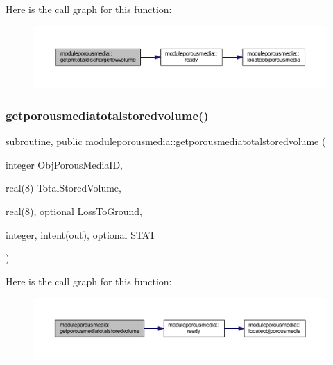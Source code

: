 Here is the call graph for this function\+:\nopagebreak
\begin{figure}[H]
\begin{center}
\leavevmode
\includegraphics[width=350pt]{namespacemoduleporousmedia_a4ef35ba24ac6cd6fbf310e39c0892c80_cgraph}
\end{center}
\end{figure}
\mbox{\label{namespacemoduleporousmedia_a3a5ad5a7ceee985765e313febb118f98}} 
\subsubsection{\texorpdfstring{getporousmediatotalstoredvolume()}{getporousmediatotalstoredvolume()}}
{\footnotesize\ttfamily subroutine, public moduleporousmedia\+::getporousmediatotalstoredvolume (\begin{DoxyParamCaption}\item[{integer}]{Obj\+Porous\+Media\+ID,  }\item[{real(8)}]{Total\+Stored\+Volume,  }\item[{real(8), optional}]{Loss\+To\+Ground,  }\item[{integer, intent(out), optional}]{S\+T\+AT }\end{DoxyParamCaption})}

Here is the call graph for this function\+:\nopagebreak
\begin{figure}[H]
\begin{center}
\leavevmode
\includegraphics[width=350pt]{namespacemoduleporousmedia_a3a5ad5a7ceee985765e313febb118f98_cgraph}
\end{center}
\end{figure}
\mbox{\label{namespacemoduleporousmedia_aa235c3281ca1f6104396eec860cafc63}} 
